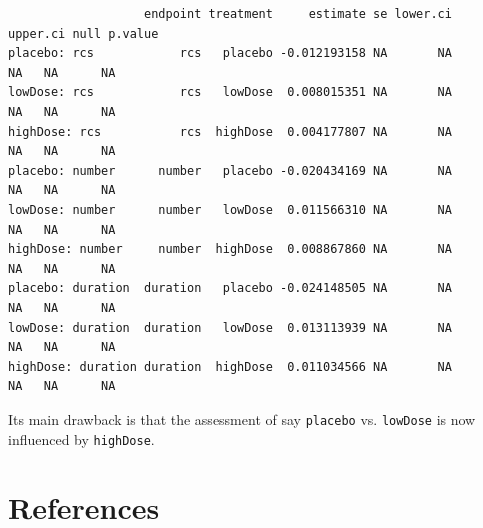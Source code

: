 \documentclass[12pt]{article}
\begin{document}
\label{}
\begin{verbatim}
                   endpoint treatment     estimate se lower.ci upper.ci null p.value
placebo: rcs            rcs   placebo -0.012193158 NA       NA       NA   NA      NA
lowDose: rcs            rcs   lowDose  0.008015351 NA       NA       NA   NA      NA
highDose: rcs           rcs  highDose  0.004177807 NA       NA       NA   NA      NA
placebo: number      number   placebo -0.020434169 NA       NA       NA   NA      NA
lowDose: number      number   lowDose  0.011566310 NA       NA       NA   NA      NA
highDose: number     number  highDose  0.008867860 NA       NA       NA   NA      NA
placebo: duration  duration   placebo -0.024148505 NA       NA       NA   NA      NA
lowDose: duration  duration   lowDose  0.013113939 NA       NA       NA   NA      NA
highDose: duration duration  highDose  0.011034566 NA       NA       NA   NA      NA
\end{verbatim}

Its main drawback is that the assessment of say \texttt{placebo}
vs. \texttt{lowDose} is now influenced by \texttt{highDose}.
\section*{References}
\label{sec:orgc4ca38e}
\begingroup
\renewcommand{\section}[2]{}




\endgroup
\end{document}
